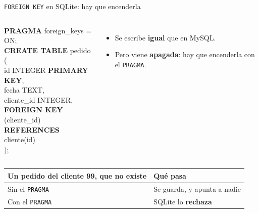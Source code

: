 \documentclass[aspectratio=169,10pt,c]{beamer}
\newcommand{\kw}[1]{\textcolor{utpRojo}{\textbf{#1}}}
\newcommand{\nuevo}[1]{{%
  \setlength{\fboxsep}{1.2pt}%
  \begingroup
  \renewcommand{\kw}[1]{\textcolor{utpNegro}{\textbf{##1}}}%
  \colorbox{yellow!45}{\textcolor{utpNegro}{#1}}%
  \endgroup}}
\newcommand{\mal}[1]{{\setlength{\fboxsep}{1.2pt}\colorbox{utpRojo!18}{#1}}}
\newenvironment{sqlcode}[1][.86\textwidth]
  {\begin{center}\begin{lrbox}{\sqlbuf}\begin{minipage}{#1}\ttfamily\footnotesize\vspace{6pt}\raggedright}
  {\vspace{6pt}\end{minipage}\end{lrbox}\colorbox{utpGrisClaro}{\usebox{\sqlbuf}}\end{center}}
\newcommand{\ind}{\hspace*{1.6em}}
\begin{document}
\begin{frame}{\texttt{FOREIGN KEY} en SQLite: hay que encenderla}
\begin{columns}[c,onlytextwidth]
\begin{sqlcode}[\textwidth]
\scriptsize
\nuevo{\kw{PRAGMA} foreign\_keys = ON;}\\[5pt]
\kw{CREATE TABLE} pedido (\\
\ind id INTEGER \kw{PRIMARY KEY},\\
\ind fecha TEXT,\\
\ind cliente\_id INTEGER,\\
\ind \kw{FOREIGN KEY} (cliente\_id)\\
\ind\ind \kw{REFERENCES} cliente(id)\\
);
\end{sqlcode}
\begin{itemize}\setlength\itemsep{8pt}
  \item Se escribe \textbf{igual} que en MySQL.
  \item Pero viene \textbf{apagada}: hay que encenderla con el \texttt{PRAGMA}.
\end{itemize}
\end{columns}
\vspace{0.15cm}
\begin{center}
\small
\renewcommand{\arraystretch}{1.2}
\begin{tabular}{>{\raggedright\arraybackslash}p{6.0cm}>{\raggedright\arraybackslash}p{6.0cm}}
\toprule
\bfseries Un pedido del cliente 99, que no existe & \bfseries Qué pasa \\
\midrule
Sin el \texttt{PRAGMA} & \mal{Se guarda}, y apunta a nadie \\
Con el \texttt{PRAGMA} & SQLite lo \textbf{rechaza} \\
\bottomrule
\end{tabular}
\end{center}
\vspace{0.15cm}
\end{frame}
\end{document}
